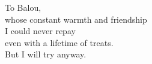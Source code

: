 \cleardoublepage

\thispagestyle{empty}
\newpage
\null

\epigraph{To Balou, \\
whose constant warmth and friendship\\
I could never repay\\
even with a lifetime of treats. \\
But I will try anyway.  }{}

\vfill
\cleardoublepage